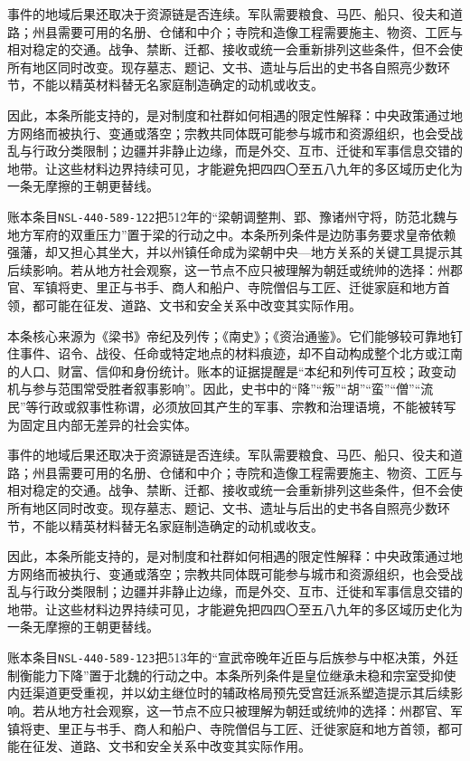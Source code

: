事件的地域后果还取决于资源链是否连续。军队需要粮食、马匹、船只、役夫和道路；州县需要可用的名册、仓储和中介；寺院和造像工程需要施主、物资、工匠与相对稳定的交通。战争、禁断、迁都、接收或统一会重新排列这些条件，但不会使所有地区同时改变。现存墓志、题记、文书、遗址与后出的史书各自照亮少数环节，不能以精英材料替无名家庭制造确定的动机或收支。

因此，本条所能支持的，是对制度和社群如何相遇的限定性解释：中央政策通过地方网络而被执行、变通或落空；宗教共同体既可能参与城市和资源组织，也会受战乱与行政分类限制；边疆并非静止边缘，而是外交、互市、迁徙和军事信息交错的地带。让这些材料边界持续可见，才能避免把四四〇至五八九年的多区域历史化为一条无摩擦的王朝更替线。

账本条目\texttt{NSL-440-589-122}把512年的“梁朝调整荆、郢、豫诸州守将，防范北魏与地方军府的双重压力”置于梁的行动之中。本条所列条件是边防事务要求皇帝依赖强藩，却又担心其坐大，并以州镇任命成为梁朝中央—地方关系的关键工具提示其后续影响。若从地方社会观察，这一节点不应只被理解为朝廷或统帅的选择：州郡官、军镇将吏、里正与书手、商人和船户、寺院僧侣与工匠、迁徙家庭和地方首领，都可能在征发、道路、文书和安全关系中改变其实际作用。

本条核心来源为《梁书》帝纪及列传；《南史》；《资治通鉴》。它们能够较可靠地钉住事件、诏令、战役、任命或特定地点的材料痕迹，却不自动构成整个北方或江南的人口、财富、信仰和身份统计。账本的证据提醒是“本纪和列传可互校；政变动机与参与范围常受胜者叙事影响”。因此，史书中的“降”“叛”“胡”“蛮”“僧”“流民”等行政或叙事性称谓，必须放回其产生的军事、宗教和治理语境，不能被转写为固定且内部无差异的社会实体。

事件的地域后果还取决于资源链是否连续。军队需要粮食、马匹、船只、役夫和道路；州县需要可用的名册、仓储和中介；寺院和造像工程需要施主、物资、工匠与相对稳定的交通。战争、禁断、迁都、接收或统一会重新排列这些条件，但不会使所有地区同时改变。现存墓志、题记、文书、遗址与后出的史书各自照亮少数环节，不能以精英材料替无名家庭制造确定的动机或收支。

因此，本条所能支持的，是对制度和社群如何相遇的限定性解释：中央政策通过地方网络而被执行、变通或落空；宗教共同体既可能参与城市和资源组织，也会受战乱与行政分类限制；边疆并非静止边缘，而是外交、互市、迁徙和军事信息交错的地带。让这些材料边界持续可见，才能避免把四四〇至五八九年的多区域历史化为一条无摩擦的王朝更替线。

账本条目\texttt{NSL-440-589-123}把513年的“宣武帝晚年近臣与后族参与中枢决策，外廷制衡能力下降”置于北魏的行动之中。本条所列条件是皇位继承未稳和宗室受抑使内廷渠道更受重视，并以幼主继位时的辅政格局预先受宫廷派系塑造提示其后续影响。若从地方社会观察，这一节点不应只被理解为朝廷或统帅的选择：州郡官、军镇将吏、里正与书手、商人和船户、寺院僧侣与工匠、迁徙家庭和地方首领，都可能在征发、道路、文书和安全关系中改变其实际作用。

